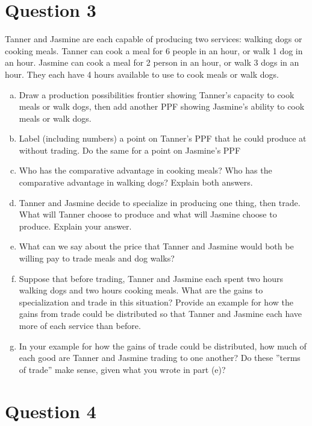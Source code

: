 \documentclass{article}
\newcommand{\question}[1]{\pagebreak\section{Question #1}}
\begin{document}
\question{3} Tanner and Jasmine are each capable of producing two services: walking dogs or cooking meals. Tanner can cook a meal for 6 people in
an hour, or walk 1 dog in an hour. Jasmine can cook a meal for 2
person in an hour, or walk 3 dogs in an hour. They each have 4 hours
available to use to cook meals or walk dogs.
\begin{enumerate}[(a)]
    \item Draw a production possibilities frontier showing Tanner's capacity to cook meals or walk dogs, then add another PPF showing
Jasmine's ability to cook meals or walk dogs.

    \item Label (including numbers) a point on Tanner's PPF that he could
produce at without trading. Do the same for a point on Jasmine's
PPF

    \item Who has the comparative advantage in cooking meals? Who
has the comparative advantage in walking dogs? Explain both
answers.

    \item Tanner and Jasmine decide to specialize in producing one thing,
then trade. What will Tanner choose to produce and what will
Jasmine choose to produce. Explain your answer.

    \item What can we say about the price that Tanner and Jasmine would
both be willing pay to trade meals and dog walks?

    \item Suppose that before trading, Tanner and Jasmine each spent two
hours walking dogs and two hours cooking meals. What are the
gains to specialization and trade in this situation? Provide an
example for how the gains from trade could be distributed so
that Tanner and Jasmine each have more of each service than
before.

    \item In your example for how the gains of trade could be distributed,
how much of each good are Tanner and Jasmine trading to one
another? Do these ”terms of trade” make sense, given what you
wrote in part (e)?
\end{enumerate}

\question{4}
\end{document}
